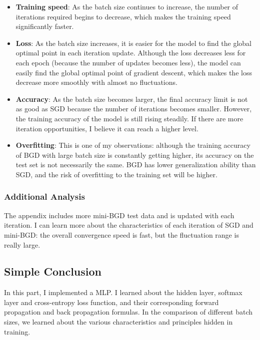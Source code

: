   \begin{itemize}
    \item {\textbf{Training speed}:
        As the batch size continues to increase, the number of iterations required begins to decrease, which makes the training speed significantly faster.
      }
    \item {\textbf{Loss}:
        As the batch size increases, it is easier for the model to find the global optimal point in each iteration update.
        Although the loss decreases less for each epoch (because the number of updates becomes less),
        the model can easily find the global optimal point of gradient descent, which makes the loss decrease more smoothly with almost no fluctuations.
      }
    \item {\textbf{Accuracy}:
        As the batch size becomes larger, the final accuracy limit is not as good as SGD because the number of iterations becomes smaller.
        However, the training accuracy of the model is still rising steadily.
        If there are more iteration opportunities, I believe it can reach a higher level.
      }
    \item {\textbf{Overfitting}:
        This is one of my observations: although the training accuracy of BGD with large batch size is constantly getting higher, its accuracy on the test set is not necessarily the same.
      BGD has lower generalization ability than SGD, and the risk of overfitting to the training set will be higher.}
  \end{itemize}

  \subsubsection{Additional Analysis}

  The appendix includes more mini-BGD test data and is updated with each iteration.
  I can learn more about the characteristics of each iteration of SGD and mini-BGD: the overall convergence speed is fast, but the fluctuation range is really large.

  \subsection{Simple Conclusion}

  In this part, I implemented a MLP.
  I learned about the hidden layer, softmax layer and cross-entropy loss function, and their corresponding forward propagation and back propagation formulas.
  In the comparison of different batch sizes, we learned about the various characteristics and principles hidden in training.
